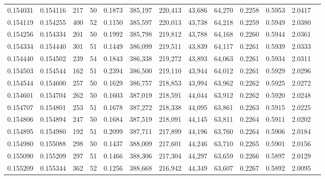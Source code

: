 \begin{tabular}{rrrrrrrrrrrrr}
0.154031 & 0.154116 &   217 &  50 &                                     0.1873 & 385,197 & 220,413 &  43,686 &  64,270 & 0.2258 & 0.5953 & 2.0417 \\
0.154119 & 0.154255 &   400 &  52 &                                     0.1150 & 385,597 & 220,013 &  43,738 &  64,218 & 0.2259 & 0.5949 & 2.0380 \\
0.154256 & 0.154334 &   201 &  50 &                                     0.1992 & 385,798 & 219,812 &  43,788 &  64,168 & 0.2260 & 0.5944 & 2.0361 \\
0.154334 & 0.154440 &   301 &  51 &                                     0.1449 & 386,099 & 219,511 &  43,839 &  64,117 & 0.2261 & 0.5939 & 2.0333 \\
0.154440 & 0.154502 &   239 &  54 &                                     0.1843 & 386,338 & 219,272 &  43,893 &  64,063 & 0.2261 & 0.5934 & 2.0311 \\
0.154503 & 0.154544 &   162 &  51 &                                     0.2394 & 386,500 & 219,110 &  43,944 &  64,012 & 0.2261 & 0.5929 & 2.0296 \\
0.154544 & 0.154600 &   257 &  50 &                                     0.1629 & 386,757 & 218,853 &  43,994 &  63,962 & 0.2262 & 0.5925 & 2.0272 \\
0.154601 & 0.154704 &   262 &  50 &                                     0.1603 & 387,019 & 218,591 &  44,044 &  63,912 & 0.2262 & 0.5920 & 2.0248 \\
0.154707 & 0.154801 &   253 &  51 &                                     0.1678 & 387,272 & 218,338 &  44,095 &  63,861 & 0.2263 & 0.5915 & 2.0225 \\
0.154806 & 0.154894 &   247 &  50 &                                     0.1684 & 387,519 & 218,091 &  44,145 &  63,811 & 0.2264 & 0.5911 & 2.0202 \\
0.154895 & 0.154980 &   192 &  51 &                                     0.2099 & 387,711 & 217,899 &  44,196 &  63,760 & 0.2264 & 0.5906 & 2.0184 \\
0.154980 & 0.155088 &   298 &  50 &                                     0.1437 & 388,009 & 217,601 &  44,246 &  63,710 & 0.2265 & 0.5901 & 2.0156 \\
0.155090 & 0.155209 &   297 &  51 &                                     0.1466 & 388,306 & 217,304 &  44,297 &  63,659 & 0.2266 & 0.5897 & 2.0129 \\
0.155209 & 0.155344 &   362 &  52 &                                     0.1256 & 388,668 & 216,942 &  44,349 &  63,607 & 0.2267 & 0.5892 & 2.0095 \\

\end{tabular}
